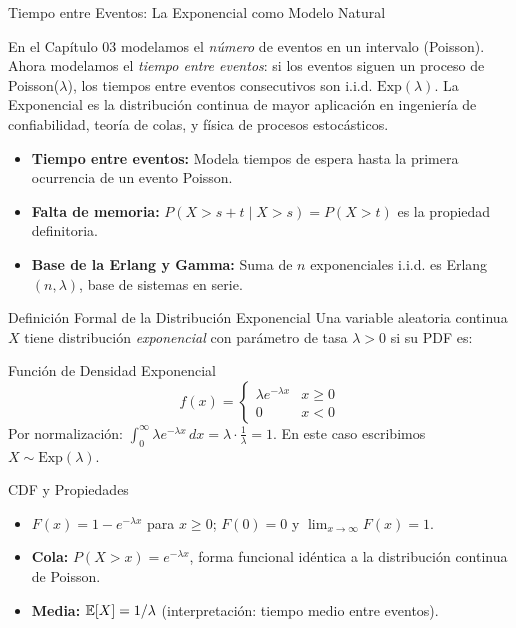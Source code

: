\documentclass[10pt, aspectratio=169]{beamer}
\begin{document}
\begin{frame}{Tiempo entre Eventos: La Exponencial como Modelo Natural}
  \footnotesize
  \begin{motivacion}
    En el Capítulo 03 modelamos el \emph{número} de eventos en un intervalo (Poisson). Ahora modelamos el \emph{tiempo entre eventos}: si los eventos siguen un proceso de Poisson($\lambda$), los tiempos entre eventos consecutivos son i.i.d. $\text{Exp}(\lambda)$. La Exponencial es la distribución continua de mayor aplicación en ingeniería de confiabilidad, teoría de colas, y física de procesos estocásticos.
  \end{motivacion}

  \vspace{0.15cm}
  \pause
  \begin{itemize}\itemsep=0.1cm
    \item \textbf{Tiempo entre eventos:} Modela tiempos de espera hasta la primera ocurrencia de un evento Poisson. \pause
    \item \textbf{Falta de memoria:} $P(X > s + t \mid X > s) = P(X > t)$ es la propiedad definitoria. \pause
    \item \textbf{Base de la Erlang y Gamma:} Suma de $n$ exponenciales i.i.d. es Erlang$(n, \lambda)$, base de sistemas en serie.
  \end{itemize}
\end{frame}

\begin{frame}{Definición Formal de la Distribución Exponencial}
  \footnotesize
  Una variable aleatoria continua $X$ tiene distribución \emph{exponencial} con parámetro de tasa $\lambda > 0$ si su PDF es: \pause

  \vspace{0.1cm}
  \begin{block}{Función de Densidad Exponencial}
    $$f(x) = \begin{cases} \lambda e^{-\lambda x} & x \ge 0 \\ 0 & x < 0 \end{cases}$$
    Por normalización: $\int_{0}^{\infty} \lambda e^{-\lambda x}\,dx = \lambda \cdot \frac{1}{\lambda} = 1$. En este caso escribimos $X \sim \text{Exp}(\lambda)$.
  \end{block}

  \vspace{0.1cm}
  \pause
  \begin{alertblock}{CDF y Propiedades}
    \begin{itemize}\itemsep=0.05cm
      \item $F(x) = 1 - e^{-\lambda x}$ para $x \ge 0$; $F(0) = 0$ y $\lim_{x \to \infty} F(x) = 1$.
      \item \textbf{Cola:} $P(X > x) = e^{-\lambda x}$, forma funcional idéntica a la distribución continua de Poisson.
      \item \textbf{Media:} $\mathbb{E}[X] = 1/\lambda$ (interpretación: tiempo medio entre eventos).
    \end{itemize}
  \end{alertblock}
\end{frame}
\end{document}
